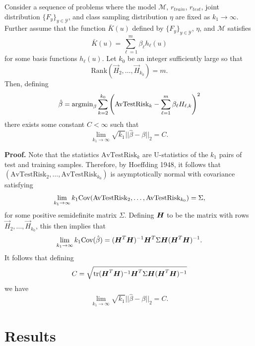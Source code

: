 \documentclass[12pt]{article}
\begin{document}
\begin{theorem}
Consider a sequence of problems where the model $\mathcal{M}$,
$r_{train}$, $r_{test}$, joint distribution
$\{F_y\}_{y \in \mathcal{Y}}$, and class sampling distribution $\eta$
are fixed as $k_1 \to \infty$.  Further assume that the function
$\bar{K}(u)$ defined by $\{F_y\}_{y \in \mathcal{Y}}$, $\eta$, and
$\mathcal{M}$ satisfies
\[
\bar{K}(u) = \sum_{\ell = 1}^m \beta_\ell h_\ell(u)
\]
for some basis functions $h_\ell(u)$.
Let $k_0$ be an integer sufficiently large so that
\[
\text{Rank}(\vec{H}_2,\hdots,\vec{H}_{k_0}) = m.
\]
Then, defining
\[
\hat{\beta} = \text{argmin}_\beta \sum_{k=2}^{k_0} \left(\text{AvTestRisk}_k - \sum_{\ell=1}^m \beta_\ell H_{\ell, k}\right)^2
\]
there exists some constant $C < \infty$ such that
\[
\lim_{k_1 \to \infty} \sqrt{k_1}||\hat{\beta}-\beta||_2 = C.
\]
\end{theorem}

\textbf{Proof.}
Note that the statistics $\text{AvTestRisk}_k$ are U-statistics of the
$k_1$ pairs of test and training samples.  Therefore, by Hoeffding
1948, it follows that
$(\text{AvTestRisk}_2,\hdots, \text{AvTestRisk}_{k_0})$ is
asymptotically normal with covariance satisfying
\[
\lim_{k_1 \to \infty} k_1 \text{Cov}(\text{AvTestRisk}_2,\hdots, \text{AvTestRisk}_{k_0}) = \Sigma,
\]
for some positive semidefinite matrix $\Sigma$.  Defining $\boldsymbol{H}$ to be
the matrix with rows $\vec{H}_2,\hdots,\vec{H}_{k_0}$, this then
implies that
\[
\lim_{k_1 \to \infty} k_1 \text{Cov}(\hat{\beta}) = (\boldsymbol{H}^T \boldsymbol{H})^{-1} \boldsymbol{H}^T \Sigma \boldsymbol{H} (\boldsymbol{H}^T \boldsymbol{H})^{-1}.
\]
It follows that defining
\[
C = \sqrt{\text{tr} (\boldsymbol{H}^T \boldsymbol{H})^{-1} \boldsymbol{H}^T \Sigma \boldsymbol{H} (\boldsymbol{H}^T \boldsymbol{H})^{-1}}
\]
we have
\[
\lim_{k_1 \to \infty} \sqrt{k_1}||\hat{\beta}-\beta||_2 = C.
\]

\section{Results}
\end{document}
